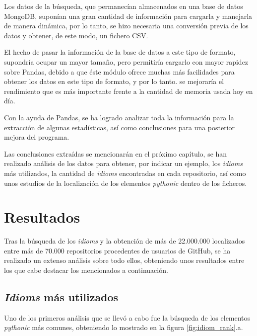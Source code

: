 \documentclass[a4paper, 12pt]{book}
\begin{document}
Los datos de la búsqueda, que permanecían almacenados en una base de datos MongoDB, suponían una gran cantidad de información para cargarla y manejarla de manera dinámica, por lo tanto, se hizo necesaria una conversión previa de los datos y obtener, de este modo, un fichero CSV.

El hecho de pasar la información de la base de datos a este tipo de formato, supondría ocupar un mayor tamaño, pero permitiría cargarlo con mayor rapidez sobre Pandas, debido a que éste módulo ofrece muchas más facilidades para obtener los datos en este tipo de formato, y por lo tanto. se mejoraría el rendimiento que es más importante frente a la cantidad de memoria usada hoy en día.

Con la ayuda de Pandas, se ha logrado analizar toda la información para la extracción de algunas estadísticas, así como conclusiones para una posterior mejora del programa.

Las conclusiones extraídas se mencionarán en el próximo capítulo, se han realizado análisis de los datos para obtener, por indicar un ejemplo, los \textit{idioms} más utilizados, la cantidad de \textit{idioms} encontradas en cada repositorio, así como unos estudios de la localización de los elementos \textit{pythonic} dentro de los ficheros.


\cleardoublepage
\chapter{Resultados}
\label{chap:results}

Tras la búsqueda de los \textit{idioms} y la obtención de más de 22.000.000 localizados entre más de 70.000 repositorios procedentes de usuarios de GitHub, se ha realizado un extenso análisis sobre todo ellos, obteniendo unos resultados entre los que cabe destacar los mencionados a continuación.




\section{\textit{Idioms} más utilizados}
\label{sec:idioms_ranking}
Uno de los primeros análisis que se llevó a cabo fue la búsqueda de los elementos \textit{pythonic} más comunes, obteniendo lo mostrado en la figura \ref{fig:idiom_rank}.a.
\end{document}
